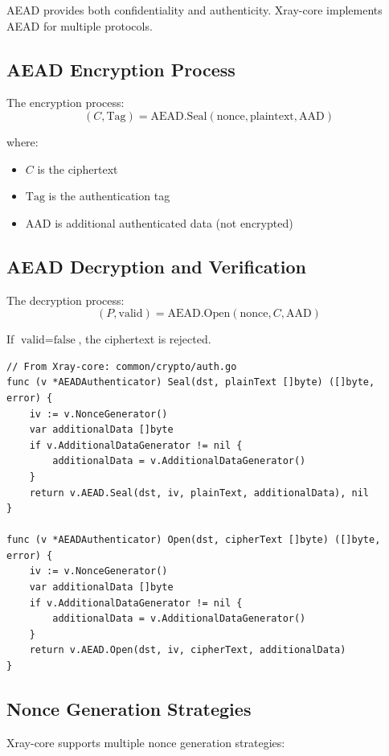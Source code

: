 AEAD provides both confidentiality and authenticity. Xray-core implements AEAD for multiple protocols.

\subsection{AEAD Encryption Process}

The encryption process:
\[
(C, \text{Tag}) = \text{AEAD.Seal}(\text{nonce}, \text{plaintext}, \text{AAD})
\]

where:
\begin{itemize}
    \item $C$ is the ciphertext
    \item $\text{Tag}$ is the authentication tag
    \item $\text{AAD}$ is additional authenticated data (not encrypted)
\end{itemize}

\subsection{AEAD Decryption and Verification}

The decryption process:
\[
(P, \text{valid}) = \text{AEAD.Open}(\text{nonce}, C, \text{AAD})
\]

If $\text{valid} = \text{false}$, the ciphertext is rejected.

\begin{verbatim}
// From Xray-core: common/crypto/auth.go
func (v *AEADAuthenticator) Seal(dst, plainText []byte) ([]byte, error) {
    iv := v.NonceGenerator()
    var additionalData []byte
    if v.AdditionalDataGenerator != nil {
        additionalData = v.AdditionalDataGenerator()
    }
    return v.AEAD.Seal(dst, iv, plainText, additionalData), nil
}

func (v *AEADAuthenticator) Open(dst, cipherText []byte) ([]byte, error) {
    iv := v.NonceGenerator()
    var additionalData []byte
    if v.AdditionalDataGenerator != nil {
        additionalData = v.AdditionalDataGenerator()
    }
    return v.AEAD.Open(dst, iv, cipherText, additionalData)
}
\end{verbatim}

\subsection{Nonce Generation Strategies}

Xray-core supports multiple nonce generation strategies:

